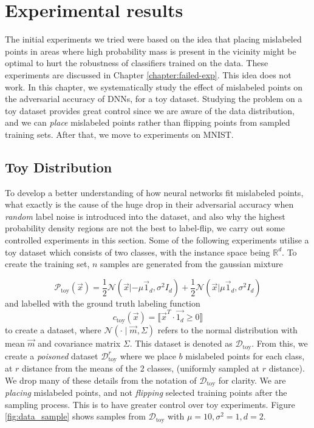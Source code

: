 \documentclass{ociamthesis}
\begin{document}
\chapter{Experimental results}
\label{chapter:experiments}

The initial experiments we tried were based on the idea that placing mislabeled
points in areas where high probability mass is present in the vicinity might be
optimal to hurt the robustness of classifiers trained on the data. These
experiments are discussed in Chapter \ref{chapter:failed-exp}. This idea does
not work. In this chapter, we systematically study the effect of mislabeled
points on the adversarial accuracy of DNNs, for a toy dataset. Studying the
problem on a toy dataset provides great control since we are aware of the data
distribution, and we can \emph{place} mislabeled points rather than flipping
points from sampled training sets. After that, we move to experiments on MNIST.

\section{Toy Distribution}

To develop a better understanding of how neural networks fit mislabeled points,
what exactly is the cause of the huge drop in their adversarial accuracy when
\emph{random} label noise is introduced into the dataset, and also why the
highest probability density regions are not the best to label-flip, we carry out
some controlled experiments in this section. Some of the following experiments
utilise a toy dataset which consists of two classes, with the instance space
being $\mathbb{R}^d$. To create the training set, $n$ samples are generated from
the gaussian mixture

\begin{equation*}
    \mathcal{P}_\text{toy}(\vec{x})=\frac{1}{2} \mathcal{N}(\vec{x}|-\mu \vec{1}_d,
    \sigma^2 I_d) + \frac{1}{2} \mathcal{N}(\vec{x}| \mu \vec{1}_d, \sigma^2 I_d)
\end{equation*}
and labelled with the ground truth labeling function 
\begin{equation*}
    c_\text{toy}(\vec{x}) = \llbracket
    \vec{x}^T \cdot\vec{1_d} \geq 0 \rrbracket 
\end{equation*}
to create a dataset, where $\mathcal{N}(\cdot \mid \vec{m}, \Sigma)$ refers to
the normal distribution with mean $\vec{m}$ and covariance matrix $\Sigma$. This
dataset is denoted as $\mathcal{D}_\text{toy}$. From this, we create a
\emph{poisoned} dataset $\mathcal{D}_\text{toy}^r$ where we place $b$ mislabeled
points for each class, at $r$ distance from the means of the 2 classes,
(uniformly sampled at $r$ distance). We drop many of these details from the
notation of $\mathcal{D}_\text{toy}$ for clarity. We are \emph{placing}
mislabeled points, and not \emph{flipping} selected training points after the
sampling process. This is to have greater control over toy experiments. Figure
\ref{fig:data_sample} shows samples from $\mathcal{D}_\text{toy}$ with $\mu=10,
\sigma^2=1, d=2$.
\end{document}
